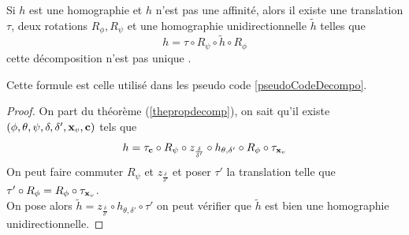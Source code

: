 \begin{corollaire}Si $h$ est une homographie et $h$ n'est pas une affinité, alors il existe une translation $\tau$, deux rotations $R_\phi ,R_\psi$ et une homographie unidirectionnelle $\tilde{h}$ telles que
\begin{equation}
h=\tau \circ R_\psi \circ \tilde{h} \circ R_\phi
\label{formule_decomposition_effective}
\end{equation}
cette décomposition n'est pas unique .
\end{corollaire}
		Cette formule est celle utilisé dans les pseudo code \ref{pseudoCodeDecompo}.
		\begin{proof}
	 On part du théorème (\ref{thepropdecomp}), on sait qu'il existe $(\phi,\theta,\psi,\delta,\delta',\mathbf{x}_v,\mathbf{c})$ tels que 
	 \begin{equation*}
	 h = \tau_{\mathbf{c}} \circ R_{\psi} \circ z_{\frac{\delta}{\delta'}} \circ h_{\theta,\delta'} \circ R_{\phi} \circ \tau_{\mathbf{x}_v}
	 \end{equation*}
	 On peut faire commuter $R_\psi$ et $z_{\frac{\delta}{\delta'}}$ et poser $\tau'$ la translation telle que $\tau' \circ R_\phi =  R_\phi \circ \tau_{\mathbf{x}_v}$.\\
	 On pose alors $\tilde{h} = z_{\frac{\delta}{\delta'}} \circ 
	 h_{\theta,\delta'} \circ \tau'$ on peut vérifier que $\tilde{h}$ est bien une homographie unidirectionnelle.
	 \end{proof}
	\label{ref_schema_decomp_cool}
